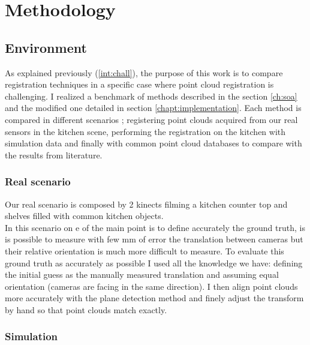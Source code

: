 
\chapter{Methodology}

\section{Environment}

    As explained previously (\ref{int:chall}), the purpose of this work is to compare registration techniques in a specific case where point cloud registration is challenging. I realized a benchmark of methods described in the section \ref{ch:soa} and the modified one detailed in section \ref{chapt:implementation}. Each method is compared in different scenarios ; registering point clouds acquired from our real sensors in the kitchen scene, performing the registration on the kitchen with simulation data and finally with common point cloud databases to compare with the results from literature. 

    \subsection{Real scenario}

        Our real scenario is composed by 2 kinects filming a kitchen counter top and shelves filled with common kitchen objects. \\
        In this scenario on e of the main point is to define accurately the ground truth, is is possible to measure with few mm of error the translation between cameras but their relative orientation is much more difficult to measure. To evaluate this ground truth as accurately as possible I used all the knowledge we have: defining the initial guess as the manually measured translation and assuming equal orientation (cameras are facing in the same direction). I then align point clouds more accurately with the plane detection method and finely adjust the transform by hand so that point clouds match exactly.

    \subsection{Simulation}\label{subsec:simulation}
    
